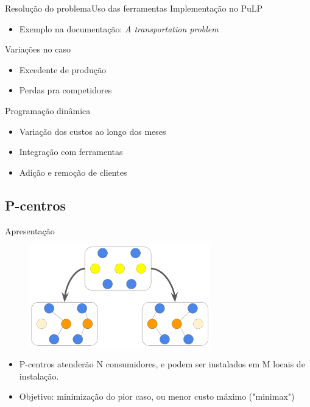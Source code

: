 \documentclass{beamer}
\newenvironment{outeritemize}{\begin{itemize}}{\end{itemize}\vspace{12pt}}
\begin{document}
\begin{frame}{Resolução do problema}{Uso das ferramentas}
    Implementação no PuLP
    \begin{outeritemize}
        \item Exemplo na documentação: \textit{A transportation problem} \cite{PuLP_coin}
    \end{outeritemize}
    Variações no caso
    \begin{outeritemize}
        \item Excedente de produção
        \item Perdas pra competidores
    \end{outeritemize}
    Programação dinâmica
    \begin{itemize}
        \item Variação dos custos ao longo dos meses
        \item Integração com ferramentas
        \item Adição e remoção de clientes 
    \end{itemize}
\end{frame}

\subsection{P-centros}

\begin{frame}{Apresentação}

\begin{figure}
    \centering
    \includegraphics[width=0.7\textwidth]{assets/PCentros/p-centros.png}
    \end{figure}

    \begin{itemize}
        \item P-centros atenderão N consumidores, e podem ser instalados em M locais de instalação.
        \item Objetivo: minimização do pior caso, ou menor custo máximo ("minimax")
    \end{itemize}
\end{frame}
\end{document}
